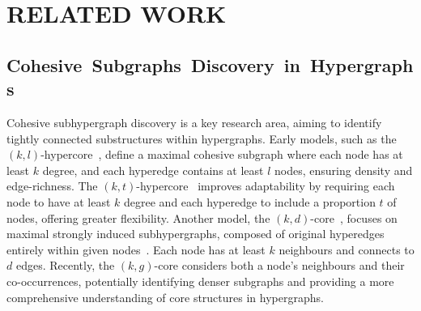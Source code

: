 \section{RELATED WORK}
\label{sec:relatedwork}






\subsection{\mbox{Cohesive Subgraphs Discovery in Hypergraphs}}
Cohesive subhypergraph discovery is a key research area, aiming to identify tightly connected substructures within hypergraphs. Early models, such as the $(k, l)$-hypercore~\cite{limnios2021hcore}, define a maximal cohesive subgraph where each node has at least $k$ degree, and each hyperedge contains at least $l$ nodes, ensuring density and edge-richness. The $(k, t)$-hypercore~\cite{bu2023hypercore} improves adaptability by requiring each node to have at least $k$ degree and each hyperedge to include a proportion $t$ of nodes, offering greater flexibility. Another model, the $(k, d)$-core~\cite{arafat2023neighborhood}, focuses on maximal strongly induced subhypergraphs, composed of original hyperedges entirely within given nodes~\cite{bahmanian2015connection, dewar2017subhypergraphs}. Each node has at least $k$ neighbours and connects to $d$ edges. Recently, the $(k, g)$-core considers both a node's neighbours and their co-occurrences, potentially identifying denser subgraphs and providing a more comprehensive understanding of core structures in hypergraphs.

